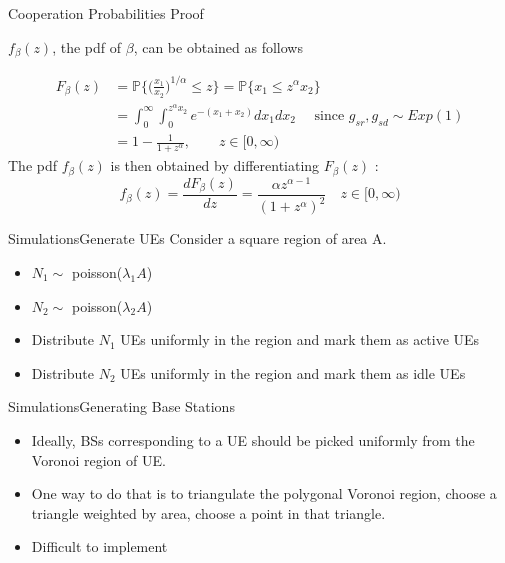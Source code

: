 \documentclass{beamer}
\begin{document}
\begin{frame}{Cooperation Probabilities} {Proof}

$f_\beta(z)$, the pdf of $\beta$, can be obtained as follows

\begin{align*}
F_\beta(z) &= \mathbb{P}\bigg\{ \bigg( \frac{x_1}{x_2}\bigg)^{1/\alpha} \leq z \bigg\} = \mathbb{P} \{ x_1\leq z^\alpha x_2\} \\
&= \int_0^\infty \int_0^{z^\alpha x_2} e^{-(x_1+x_2)} dx_1dx_2 \quad \text{ since } g_{sr},g_{sd} \sim Exp(1) \\ 
&= 1-\frac{1}{1+z^\alpha}, \qquad z \in [0,\infty)
\end{align*}
The pdf $f_\beta(z)$ is then obtained by differentiating $F_\beta(z)$ :
\begin{equation*}
    f_\beta(z) = \frac{dF_\beta(z)}{dz} = \frac{\alpha z^{\alpha-1}}{(1+z^\alpha)^2} \quad z \in [0,\infty)
\end{equation*}


\end{frame}





\begin{frame}{Simulations}{Generate UEs}
Consider a square region of area A. 
\begin{itemize}
\item  $N_1 \sim $ poisson($\lambda_1 A$)
\item $N_2 \sim $ poisson($\lambda_2 A$)
\item Distribute $N_1$ UEs uniformly in the region and mark them as active UEs
\item Distribute $N_2$ UEs uniformly in the region and mark them as idle UEs
\end{itemize}
\end{frame}


\begin{frame}{Simulations}{Generating Base Stations}
\vspace{-1cm}
\begin{itemize}
\item Ideally, BSs corresponding to a UE should be picked uniformly from the Voronoi region of UE. 
\vspace{1cm}
\pause
\item One way to do that is to triangulate the polygonal Voronoi region, choose a triangle weighted by area, choose a point in that triangle.
\vspace{1cm}
\pause
\item Difficult to implement
\end{itemize}

\end{frame}
\end{document}
